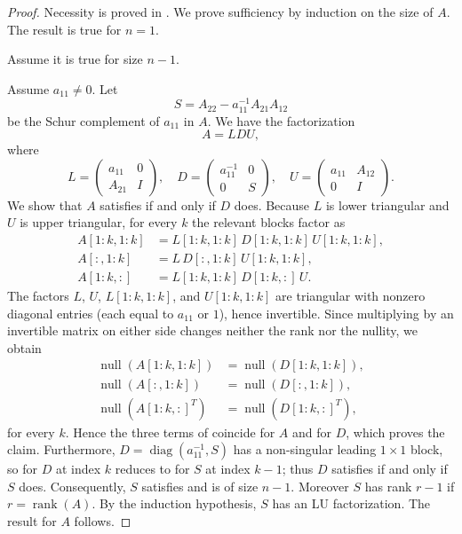 \documentclass[final]{siamart1116}
\numberwithin{theorem}{section}
\DeclareMathOperator{\rk}{rank}
\DeclareMathOperator{\nl}{null}
\begin{document}
\begin{proof}
  Necessity is proved in . We prove sufficiency by induction on the size of $A$. The result is true for $n=1$.

  Assume it is true for size $n-1$.

  Assume $a_{11} \neq 0$. Let
  \[
    S = A_{22} - a_{11}^{-1} A_{21} A_{12}
  \]
  be the Schur complement of $a_{11}$ in $A$. We have the factorization
  \[
    A = LDU,
  \]
  where
  \[
    L =
    \begin{pmatrix}
      a_{11} & 0 \\
      A_{21} & I
    \end{pmatrix}, \quad
    D =
    \begin{pmatrix}
      a_{11}^{-1} & 0 \\
      0           & S
    \end{pmatrix}, \quad
    U =
    \begin{pmatrix}
      a_{11} & A_{12} \\
      0      & I
    \end{pmatrix}.
  \]
  We show that $A$ satisfies  if and only if $D$ does. Because $L$ is lower triangular and $U$ is upper triangular, for every $k$ the relevant blocks factor as
  \begin{align*}
    A[1:k,1:k] & = L[1:k,1:k]\, D[1:k,1:k]\, U[1:k,1:k], \\
    A[:,1:k]   & = L\, D[:,1:k]\, U[1:k,1:k],            \\
    A[1:k,:]   & = L[1:k,1:k]\, D[1:k,:]\, U.
  \end{align*}
  The factors $L$, $U$, $L[1:k,1:k]$, and $U[1:k,1:k]$ are triangular with nonzero diagonal entries (each equal to $a_{11}$ or $1$), hence invertible. Since multiplying by an invertible matrix on either side changes neither the rank nor the nullity, we obtain
  \begin{align*}
    \nl(A[1:k,1:k])   & = \nl(D[1:k,1:k]),  \\
    \nl(A[:,1:k])     & = \nl(D[:,1:k]),     \\
    \nl({A[1:k,:]}^T) & = \nl({D[1:k,:]}^T),
  \end{align*}
  for every $k$. Hence the three terms of  coincide for $A$ and for $D$, which proves the claim. Furthermore, $D = \operatorname{diag}(a_{11}^{-1}, S)$ has a non-singular leading $1 \times 1$ block, so  for $D$ at index $k$ reduces to  for $S$ at index $k-1$; thus $D$ satisfies  if and only if $S$ does. Consequently, $S$ satisfies  and is of size $n-1$. Moreover $S$ has rank $r-1$ if $r = \rk(A)$. By the induction hypothesis, $S$ has an LU factorization. The result for $A$ follows.


\end{proof}
\end{document}
